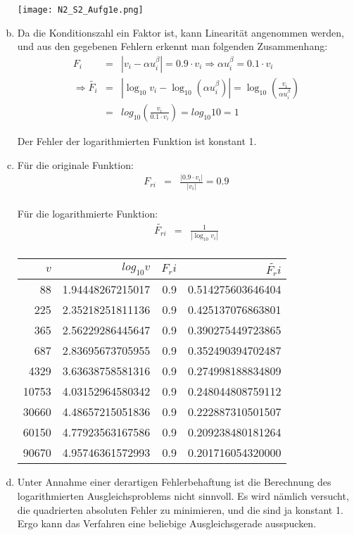\documentclass[11pt]{article} %
\begin{document}
\begin{enumerate}[a)]
\texttt{[image: N2\_S2\_Aufg1e.png]}

\item

Da die Konditionszahl ein Faktor ist, kann Linearität angenommen werden, und aus den gegebenen Fehlern erkennt man folgenden Zusammenhang:
\begin{eqnarray*}
F_i &=& |v_i - \alpha u_i^\beta| = 0.9\cdot v_i \Rightarrow \alpha u_i^\beta = 0.1\cdot v_i \\
\Rightarrow \tilde{F_i} &=& |\log_{10}v_i - \log_{10}(\alpha u_i^\beta)| = \log_{10}\left(\frac{v_i}{\alpha u_i^\beta}\right) \\
&=& log_{10}\left(\frac{v_i}{0.1\cdot v_i}\right) = log_{10}10 = 1
\end{eqnarray*}

Der Fehler der logarithmierten Funktion ist konstant 1.

\item

Für die originale Funktion:
\begin{eqnarray*}
F_{ri} &=& \frac{|0.9\cdot v_i|}{|v_i|} = 0.9 \\
\end{eqnarray*}

Für die logarithmierte Funktion:
\begin{eqnarray*}
\tilde{F_{ri}} &=& \frac{1}{|\log_{10}v_i|} \\
\end{eqnarray*}

\begin{tabular}{r|r|r|r}
$v$ & $log_{10}v$ & $F_ri$ & $\tilde{F_ri}$ \\
\hline
88 &		1.94448267215017 & 0.9 & 0.514275603646404 \\ 
225 &	2.35218251811136& 0.9 & 0.425137076863801  \\
365 &	2.56229286445647 & 0.9 & 0.390275449723865  \\
687 &	2.83695673705955& 0.9 & 0.352490394702487  \\
4329 &	3.63638758581316 & 0.9 & 0.274998188834809  \\
10753 &	4.03152964580342 & 0.9 & 0.248044808759112  \\
30660 &	4.48657215051836 & 0.9 & 0.222887310501507  \\
60150 &	4.77923563167586 & 0.9 & 0.209238480181264  \\
90670 &	4.95746361572993 & 0.9 & 0.201716054320000 \\
\end{tabular}

\item Unter Annahme einer derartigen Fehlerbehaftung ist die Berechnung des logarithmierten Ausgleichsproblems nicht sinnvoll. Es wird nämlich versucht, die quadrierten absoluten Fehler zu minimieren, und die sind ja konstant 1. Ergo kann das Verfahren eine beliebige Ausgleichsgerade ausspucken.

\end{enumerate}
\end{document}
